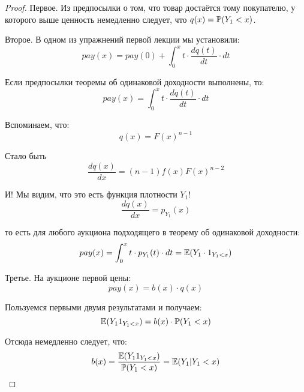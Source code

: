 \begin{proof}

Первое. Из предпосылки о том, что товар достаётся тому покупателю, у которого выше ценность немедленно следует, что $ q(x)=\P(Y_{1}<x) $.

Второе. В одном из упражнений первой лекции мы установили:
\begin{equation}
pay(x)=pay(0)+\int_{0}^{x}t \cdot \frac{dq(t)}{dt}\cdot dt
\end{equation}

Если предпосылки теоремы об одинаковой доходности выполнены, то:
\begin{equation}
pay(x)=\int_{0}^{x}t \cdot \frac{dq(t)}{dt}\cdot dt
\end{equation}


Вспоминаем, что:
\begin{equation}
q(x)=F(x)^{n-1}
\end{equation}

Стало быть
\begin{equation}
\frac{dq(x)}{dx}=(n-1)f(x)F(x)^{n-2}
\end{equation}

И! Мы видим, что это есть функция плотности $ Y_{1} $!
\begin{equation}
\frac{dq(x)}{dx}=p_{Y_{1}}(x)
\end{equation}

то есть для любого аукциона подходящего в теорему об одинаковой доходности:
\begin{equation}
pay(x)=\int_{0}^{x}t \cdot p_{Y_{1}}(t)\cdot dt=\E(Y_{1}\cdot 1_{Y_{1}<x})
\end{equation}



Третье. На аукционе первой цены:
\begin{equation}
pay(x)=b(x)\cdot q(x)
\end{equation}

Пользуемся первыми двумя результатами и получаем:
\begin{equation}
\E(Y_{1}1_{Y_{1}<x})=b(x)\cdot \P(Y_{1}<x)
\end{equation}

Отсюда немедленно следует, что:
\begin{equation}
b(x)=\frac{\E(Y_{1}1_{Y_{1}<x})}{\P(Y_{1}<x)}=\E(Y_{1}|Y_{1}<x)
\end{equation}



\end{proof}







